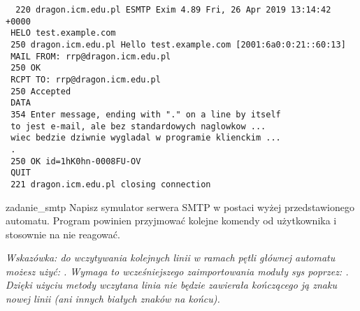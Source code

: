 \documentclass{pdfBooklets}
\begin{document}
{\vspace{0.3cm}\noindent\tt
   \hspace{1cm}\color{xgreen}220 dragon.icm.edu.pl ESMTP Exim 4.89 Fri, 26 Apr 2019 13:14:42 +0000
\\ \hspace{1cm}\color{blue}HELO test.example.com
\\ \hspace{1cm}\color{xgreen}250 dragon.icm.edu.pl Hello test.example.com [2001:6a0:0:21::60:13]
\\ \hspace{1cm}\color{blue}MAIL FROM: rrp@dragon.icm.edu.pl
\\ \hspace{1cm}\color{xgreen}250 OK
\\ \hspace{1cm}\color{blue}RCPT TO: rrp@dragon.icm.edu.pl
\\ \hspace{1cm}\color{xgreen}250 Accepted
\\ \hspace{1cm}\color{blue}DATA
\\ \hspace{1cm}\color{xgreen}354 Enter message, ending with "." on a line by itself
\\ \hspace{1cm}\color{blue}to jest e-mail, ale bez standardowych naglowkow ...
\\ \hspace{1cm}\color{blue}wiec bedzie dziwnie wygladal w programie klienckim ...
\\ \hspace{1cm}\color{blue}.
\\ \hspace{1cm}\color{xgreen}250 OK id=1hK0hn-0008FU-OV
\\ \hspace{1cm}\color{blue}QUIT
\\ \hspace{1cm}\color{xgreen}221 dragon.icm.edu.pl closing connection
\color{black}\vspace{0.3cm}}

\begin{Zadanie}{}{zadanie_smtp}
Napisz symulator serwera SMTP w postaci wyżej przedstawionego automatu. Program powinien przyjmować kolejne komendy od użytkownika i stosownie na nie reagować.

\vspace{0.3cm}
\emph{Wskazówka: do wczytywania kolejnych linii w ramach pętli głównej automatu możesz użyć: .
                 Wymaga to wcześniejszego zaimportowania moduły sys poprzez: .\student{\\}
                 Dzięki użyciu metody  wczytana linia nie będzie zawierała kończącego ją znaku nowej linii (ani innych białych znaków na końcu).
}
\end{Zadanie}
\end{document}
